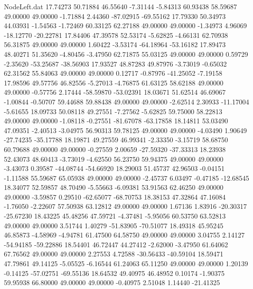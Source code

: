 \begin{filecontents}{NodeLeft.dat}
  17.74273   50.71884   46.55640    -7.31144   -5.84313   60.93438   58.59687   49.00000   49.00000   -1.71884    2.44360  -87.02915  -69.55162
  17.79330   50.34973   44.03931    -1.54563   -1.72469   60.33125   62.27188   49.00000   49.00000   -1.34973    4.96069  -18.12770  -20.22781
  17.84406   47.39578   52.53174    -5.62825   -4.66131   62.70938   56.31875   49.00000   49.00000    1.60422   -3.53174  -64.18964  -53.16182
  17.89473   48.40271   51.35620    -4.80456   -3.47950   62.71875   55.03125   49.00000   49.00000    0.59729   -2.35620  -53.25687  -38.56903
  17.93527   48.87283   49.87976    -3.73019   -0.65032   62.31562   55.84063   49.00000   49.00000    0.12717   -0.87976  -41.25052   -7.19158
  17.98596   49.57756   46.82556    -5.27013   -4.76875   61.63125   58.62188   49.00000   49.00000   -0.57756    2.17444  -58.59870  -53.02391
  18.03671   51.62514   46.69067    -1.00844   -0.50707   59.44688   59.88438   49.00000   49.00000   -2.62514    2.30933  -11.17004   -5.61655
  18.09733   50.08118   49.27551    -7.27562   -5.62825   59.75000   58.22813   49.00000   49.00000   -1.08118   -0.27551  -81.67078  -63.17858
  18.14811   53.03490   47.09351    -2.40513   -3.04975   56.90313   59.78125   49.00000   49.00000   -4.03490    1.90649  -27.74235  -35.17788
  18.19871   49.27559   46.99341    -2.33350   -3.15719   58.68750   60.79688   49.00000   49.00000   -0.27559    2.00659  -27.59320  -37.33313
  18.23938   52.43073   48.60413    -3.73019   -4.62550   56.23750   59.94375   49.00000   49.00000   -3.43073    0.39587  -44.08744  -54.66920
  18.29003   51.45737   42.96503    -0.04151   -1.11588   55.59687   65.05938   49.00000   49.00000   -2.45737    6.03497   -0.47185  -12.68545
  18.34077   52.59857   48.70490    -5.55663   -6.09381   53.91563   62.46250   49.00000   49.00000   -3.59857    0.29510  -62.65077  -68.70753
  18.38153   47.32864   47.16084    -1.76050   -2.22607   57.50938   63.12812   49.00000   49.00000    1.67136    1.83916  -20.30317  -25.67230
  18.43225   45.48256   47.59721    -4.37481   -5.95056   60.53750   63.52813   49.00000   49.00000    3.51744    1.40279  -51.83905  -70.51077
  18.49318   45.95245   46.85873    -4.58969   -4.94781   61.47500   64.58750   49.00000   49.00000    3.04755    2.14127  -54.94185  -59.22886
  18.54401   46.72447   44.27412    -2.62000   -3.47950   61.64062   67.76562   49.00000   49.00000    2.27553    4.72588  -30.56433  -40.59104
  18.59471   47.79861   49.14125    -5.05525   -6.16544   61.24063   65.11250   49.00000   49.00000    1.20139   -0.14125  -57.02751  -69.55136
  18.64532   49.40975   46.48952     0.10174   -1.90375   59.95938   66.80000   49.00000   49.00000   -0.40975    2.51048    1.14440  -21.41325

\end{filecontents}
